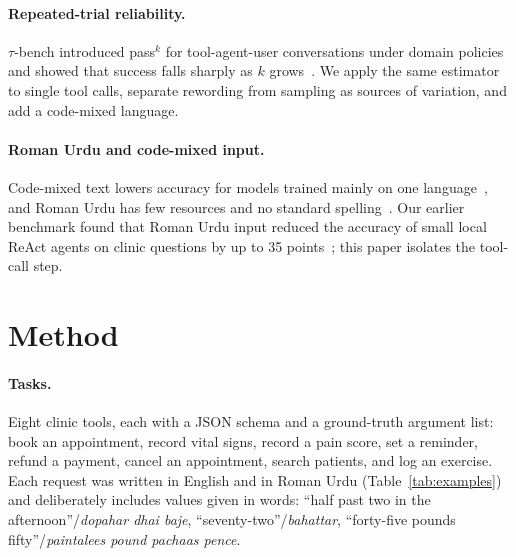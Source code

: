 \documentclass[11pt,a4paper]{article}
\newcommand{\passk}[1]{pass$^{#1}$}
\begin{document}
\paragraph{Repeated-trial reliability.} $\tau$-bench introduced \passk{k} for tool-agent-user conversations under domain
policies and showed that success falls sharply as $k$ grows~\cite{yao2024tau}. We apply the same estimator to single
tool calls, separate rewording from sampling as sources of variation, and add a code-mixed language.

\paragraph{Roman Urdu and code-mixed input.} Code-mixed text lowers accuracy for models trained mainly on one
language~\cite{khanuja2020gluecos}, and Roman Urdu has few resources and no standard spelling~\cite{butt2025romanir,butt2025transliteration}.
Our earlier benchmark found that Roman Urdu input reduced the accuracy of small local ReAct agents on clinic questions by
up to 35 points~\cite{hussain2026romanurdu}; this paper isolates the tool-call step.

\section{Method}

\paragraph{Tasks.} Eight clinic tools, each with a JSON schema and a ground-truth argument list: book an
appointment, record vital signs, record a pain score, set a reminder, refund a payment, cancel an appointment,
search patients, and log an exercise. Each request was written in English and in Roman Urdu (Table~\ref{tab:examples})
and deliberately includes values given in words: ``half past two in the afternoon''/\emph{dopahar dhai baje},
``seventy-two''/\emph{bahattar}, ``forty-five pounds fifty''/\emph{paintalees pound pachaas pence}.
\end{document}

